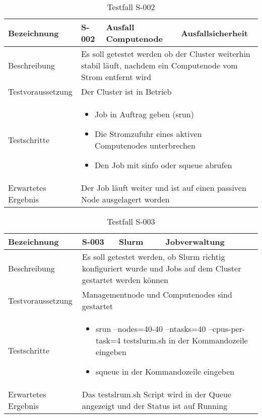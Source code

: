 \begin{table}[H]
\centering
\begin{tabular}{|p{4cm}|p{4cm}|p{4cm}|p{4cm}|}
\hline
Bezeichnung & \textbf{S-002} & Ausfall Computenode & Ausfallsicherheit \\\hline
Beschreibung & \multicolumn{3}{p{12cm}|}{Es soll getestet werden ob der Cluster weiterhin stabil läuft, nachdem ein Computenode vom Strom entfernt wird} \\\hline
Testvoraussetzung & \multicolumn{3}{p{12cm}|}{Der Cluster ist in Betrieb} \\\hline
Testschritte & \multicolumn{3}{p{12cm}|}{\begin{itemize}
\item Job in Auftrag geben (srun)
\item Die Stromzufuhr eines aktiven Computenodes unterbrechen
\item Den Job mit sinfo oder squeue abrufen
\end{itemize}} \\ \hline
Erwartetes Ergebnis & \multicolumn{3}{p{12cm}|}{Der Job läuft weiter und ist auf einen passiven Node ausgelagert worden}\\\hline
\end{tabular}
\caption{Testfall S-002}
\label{Testfall S-002}
\end{table}

\begin{table}[H]
\centering
\begin{tabular}{|p{4cm}|p{4cm}|p{4cm}|p{4cm}|}
\hline
Bezeichnung & \textbf{S-003} & Slurm & Jobverwaltung \\\hline
Beschreibung & \multicolumn{3}{p{12cm}|}{Es soll getestet werden, ob Slurm richtig konfiguriert wurde und Jobs auf dem Cluster gestartet werden können} \\\hline
Testvoraussetzung & \multicolumn{3}{p{12cm}|}{Managementnode und Computenodes sind gestartet} \\\hline
Testschritte & \multicolumn{3}{p{12cm}|}{\begin{itemize}
\item srun --nodes=40-40 --ntasks=40 --cpus-per-task=4 testslurm.sh in der Kommandozeile eingeben
\item squeue in der Kommandozeile eingeben
\end{itemize}} \\ \hline
Erwartetes Ergebnis & \multicolumn{3}{p{12cm}|}{Das testslrum.sh Script wird in der Queue angezeigt und der Status ist auf Running}\\\hline
\end{tabular}
\caption{Testfall S-003}
\label{Testfall S-003}
\end{table}

